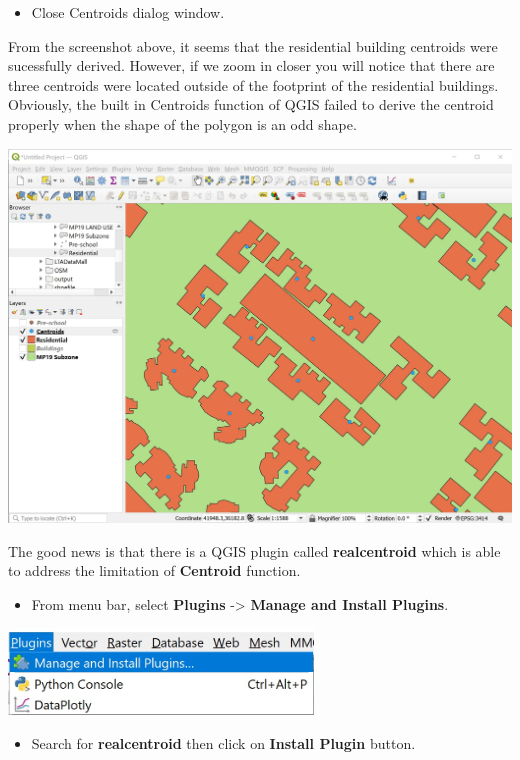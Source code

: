 \documentclass[
  letterpaper,
  DIV=11,
  numbers=noendperiod]{scrreprt}
\providecommand{\tightlist}{%
  \setlength{\itemsep}{0pt}\setlength{\parskip}{0pt}}\usepackage{longtable,booktabs,array}
\begin{document}
\begin{itemize}
\tightlist
\item
  Close Centroids dialog window.
\end{itemize}

From the screenshot above, it seems that the residential building
centroids were sucessfully derived. However, if we zoom in closer you
will notice that there are three centroids were located outside of the
footprint of the residential buildings. Obviously, the built in
Centroids function of QGIS failed to derive the centroid properly when
the shape of the polygon is an odd shape.

\includegraphics{./img04/image109.jpg}

The good news is that there is a QGIS plugin called
\textbf{realcentroid} which is able to address the limitation of
\textbf{Centroid} function.

\begin{itemize}
\tightlist
\item
  From menu bar, select \textbf{Plugins} -\textgreater{} \textbf{Manage
  and Install Plugins}.
\end{itemize}

\includegraphics[width=3.1875in,height=\textheight]{./img04/image110.jpg}

\begin{itemize}
\tightlist
\item
  Search for \textbf{realcentroid} then click on \textbf{Install Plugin}
  button.
\end{itemize}
\end{document}
